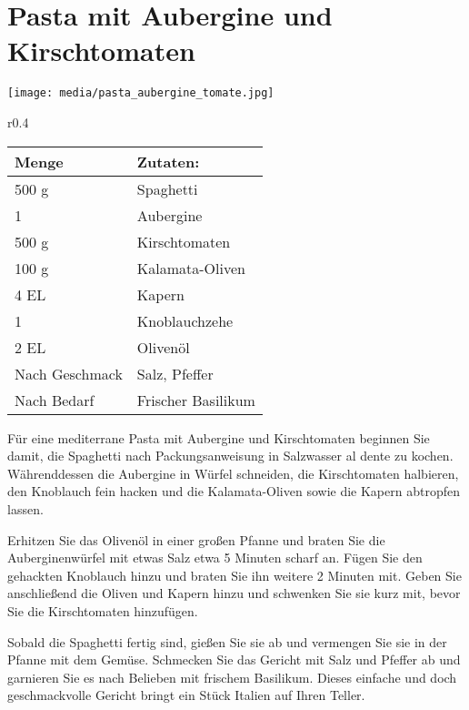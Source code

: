 \documentclass[../../book.tex]{subfiles}
\begin{document}
\section{Pasta mit Aubergine und Kirschtomaten}

\begin{figure*}[h]
  \centering
  \texttt{[image: media/pasta\_aubergine\_tomate.jpg]}
\end{figure*}

\begin{wraptable}{r}{0.4\textwidth}
  \centering
  \begin{tabularx}{0.39\textwidth}{|l|X|}
    \toprule
    Menge & Zutaten: \\
    \midrule
    500 g & Spaghetti \\
    \midrule
    1 & Aubergine \\
    \midrule
    500 g & Kirschtomaten \\
    \midrule
    100 g & Kalamata-Oliven \\
    \midrule
    4 EL & Kapern \\
    \midrule
    1 & Knoblauchzehe \\
    \midrule
    2 EL & Olivenöl \\
    \midrule
    Nach Geschmack & Salz, Pfeffer \\
    \midrule
    Nach Bedarf & Frischer Basilikum \\
    \bottomrule
  \end{tabularx}
\end{wraptable}

Für eine mediterrane Pasta mit Aubergine und Kirschtomaten beginnen Sie damit, die Spaghetti nach Packungsanweisung in Salzwasser al dente zu kochen. Währenddessen die Aubergine in Würfel schneiden, die Kirschtomaten halbieren, den Knoblauch fein hacken und die Kalamata-Oliven sowie die Kapern abtropfen lassen.

Erhitzen Sie das Olivenöl in einer großen Pfanne und braten Sie die Auberginenwürfel mit etwas Salz etwa 5 Minuten scharf an. Fügen Sie den gehackten Knoblauch hinzu und braten Sie ihn weitere 2 Minuten mit. Geben Sie anschließend die Oliven und Kapern hinzu und schwenken Sie sie kurz mit, bevor Sie die Kirschtomaten hinzufügen.

Sobald die Spaghetti fertig sind, gießen Sie sie ab und vermengen Sie sie in der Pfanne mit dem Gemüse. Schmecken Sie das Gericht mit Salz und Pfeffer ab und garnieren Sie es nach Belieben mit frischem Basilikum. Dieses einfache und doch geschmackvolle Gericht bringt ein Stück Italien auf Ihren Teller.
\newpage
\end{document}
